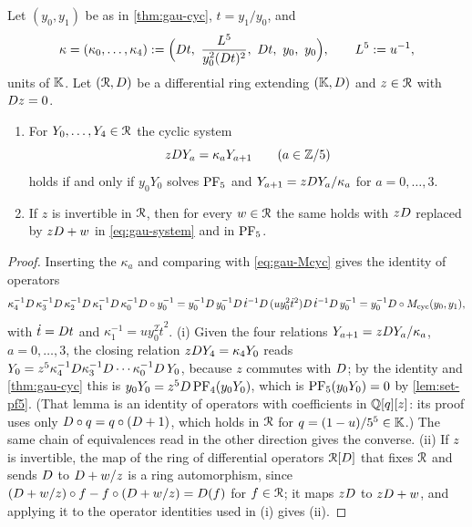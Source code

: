 \begin{cor}
\label{cor:gau-cycsys}
Let $(y_0,y_1)$ be as in \cref{thm:gau-cyc}, $t=y_1/y_0$, and
\[
\kappa=(\kappa_0,\dots,\kappa_4):=\Bigl(\Dq t,\ \frac{L^5}{y_0^2(\Dq t)^2},\ \Dq t,\ y_0,\ y_0\Bigr),\qquad L^5:=u^{-1},
\]
units of $\mathbb{K}$. Let $(\mathcal{R},D)$ be a differential ring extending $(\mathbb{K},D)$ and $z\in\mathcal{R}$ with $D z=0$.
\begin{enumerate}
\item For $Y_0,\dots,Y_4\in\mathcal{R}$ the cyclic system
\begin{equation}
\label{eq:gau-system}
zD Y_a=\kappa_aY_{a+1}\qquad(a\in\mathbb{Z}/5)
\end{equation}
holds if and only if $y_0Y_0$ solves $\mathrm{PF}_{5}$ and $Y_{a+1}=zD Y_a/\kappa_a$ for $a=0,\dots,3$.
\item If $z$ is invertible in $\mathcal{R}$, then for every $w\in\mathcal{R}$ the same holds with $zD$ replaced by $zD+w$ in \eqref{eq:gau-system} and in $\mathrm{PF}_{5}$.
\end{enumerate}
\end{cor}

\begin{proof}
Inserting the $\kappa_a$ and comparing with \eqref{eq:gau-Mcyc} gives the identity of operators
\[
\kappa_4^{-1}D\,\kappa_3^{-1}D\,\kappa_2^{-1}D\,\kappa_1^{-1}D\,\kappa_0^{-1}D\circ y_0^{-1}=y_0^{-1}D\,y_0^{-1}D\,\dot t^{-1}D\,(uy_0^2\dot t^2)D\,\dot t^{-1}D\,y_0^{-1}=y_0^{-1}D\circ M_{\mathrm{cyc}}(y_0,y_1),
\]
with $\dot t=D t$ and $\kappa_1^{-1}=uy_0^2\dot t^2$. (i) Given the four relations $Y_{a+1}=zD Y_a/\kappa_a$, $a=0,\dots,3$, the closing relation $zD Y_4=\kappa_4Y_0$ reads $Y_0=z^5\kappa_4^{-1}D\kappa_3^{-1}D\cdots\kappa_0^{-1}D\,Y_0$, because $z$ commutes with $D$; by the identity and \cref{thm:gau-cyc} this is $y_0Y_0=z^5D\,\mathrm{PF}_{4}(y_0Y_0)$, which is $\mathrm{PF}_{5}(y_0Y_0)=0$ by \cref{lem:set-pf5}. (That lemma is an identity of operators with coefficients in $\mathbb{Q}[q][z]$: its proof uses only $D\circ q=q\circ(D+1)$, which holds in $\mathcal{R}$ for $q=(1-u)/5^5\in\mathbb{K}$.) The same chain of equivalences read in the other direction gives the converse. (ii) If $z$ is invertible, the map of the ring of differential operators $\mathcal{R}[D]$ that fixes $\mathcal{R}$ and sends $D$ to $D+w/z$ is a ring automorphism, since $(D+w/z)\circ f-f\circ(D+w/z)=D(f)$ for $f\in\mathcal{R}$; it maps $zD$ to $zD+w$, and applying it to the operator identities used in (i) gives (ii).
\end{proof}

